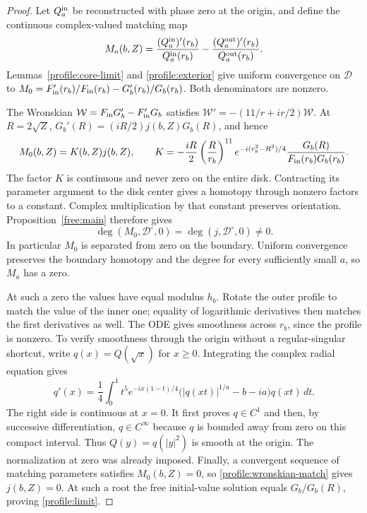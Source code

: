 \begin{proof}
Let $Q^{\rm in}_a$ be reconstructed with phase zero at the origin, and
define the continuous complex-valued matching map
\[
 M_a(b,Z)=\frac{(Q^{\rm in}_a)'(r_b)}{Q^{\rm in}_a(r_b)}
       -\frac{(Q^{\rm out}_a)'(r_b)}{Q^{\rm out}_a(r_b)}.
\]
Lemmas~\ref{profile:core-limit} and \ref{profile:exterior} give uniform
convergence on $\mathcal D$ to
$M_0=F_{\rm in}'(r_b)/F_{\rm in}(r_b)-G_b'(r_b)/G_b(r_b)$.
Both denominators are nonzero.

The Wronskian $\mathcal W=F_{\rm in}G_b'-F_{\rm in}'G_b$ satisfies
$\mathcal W'=-(11/r+ir/2)\mathcal W$.  At $R=2\sqrt Z$,
$G_b'(R)=(iR/2)j(b,Z)G_b(R)$, and hence
\begin{equation}\label{profile:wronskian-match}
 M_0(b,Z)=K(b,Z)j(b,Z),\qquad
 K=-\frac{iR}{2}\left(\frac R{r_b}\right)^{11}
 e^{-i(r_b^2-R^2)/4}
 \frac{G_b(R)}{F_{\rm in}(r_b)G_b(r_b)}.
\end{equation}
The factor $K$ is continuous and never zero on the entire disk.
Contracting its parameter argument to the disk center gives a homotopy
through nonzero factors to a constant.  Complex multiplication by that
constant preserves orientation.  Proposition~\ref{free:main} therefore
gives
\[
 \deg(M_0,\mathcal D^\circ,0)
       =\deg(j,\mathcal D^\circ,0)\ne0.
\]
In particular $M_0$ is separated from zero on the boundary.  Uniform
convergence preserves the boundary homotopy and the degree for every
sufficiently small $a$, so $M_a$ has a zero.

At such a zero the values have equal modulus $h_b$.  Rotate the outer
profile to match the value of the inner one; equality of logarithmic
derivatives then matches the first derivatives as well.  The ODE gives
smoothness across $r_b$, since the profile is nonzero.  To verify
smoothness through the origin without a regular-singular shortcut,
write $q(x)=Q(\sqrt x)$ for $x\ge0$.  Integrating the complex radial
equation gives
\[
 q'(x)=\frac14\int_0^1t^5e^{-ix(1-t)/4}
       \big(|q(xt)|^{1/a}-b-ia\big)q(xt)\,dt.
\]
The right side is continuous at $x=0$.  It first proves $q\in C^1$ and
then, by successive differentiation, $q\in C^\infty$ because $q$ is
bounded away from zero on this compact interval.  Thus
$Q(y)=q(|y|^2)$ is smooth at the origin.  The normalization at zero was
already imposed.  Finally, a convergent sequence of matching parameters
satisfies $M_0(b,Z)=0$, so \eqref{profile:wronskian-match} gives
$j(b,Z)=0$.  At such a root the free initial-value solution equals
$G_b/G_b(R)$, proving \eqref{profile:limit}.
\end{proof}

